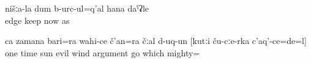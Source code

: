 %
\begin{exe}
	\ex	\label{ex:Our (people) were fasting like nowadays}
	\gll	nišːa-la	dum	b-urc-ul=q'al	hana	daˁʡle\\
			edge	keep	now	as\\
	\glt	{}

	\ex	\label{ex:Once the sun and the evil wind argued about who is stronger}
	\gll	ca	zamana	bari=ra	wahi-ce	č'an=ra	čːal	d-uq-un	[kutːi	ču-cːe-rka	c'aq'-ce=de=l]\\
		one	time	sun	evil	wind	argument	go	which		mighty=\\
	\glt	{}
\end{exe}

